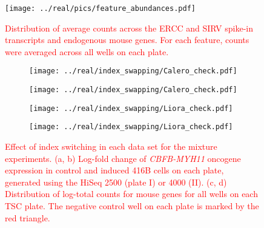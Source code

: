 \documentclass{article}
\newcommand\revised[1]{\textcolor{red}{#1}}
\begin{document}
\begin{figure}[btp]
    \begin{center}
        \texttt{[image: ../real/pics/feature\_abundances.pdf]}
    \end{center}
    \caption{\revised{Distribution of average counts across the ERCC and SIRV spike-in transcripts and endogenous mouse genes.
    For each feature, counts were averaged across all wells on each plate.}}
\end{figure}

\begin{figure}[btp]
    \begin{center}
        \begin{subfigure}{0.49\textwidth}
            \texttt{[image: ../real/index\_swapping/Calero\_check.pdf]}
            \caption{}
        \end{subfigure}
        \begin{subfigure}{0.49\textwidth}
            \texttt{[image: ../real/index\_swapping/Calero\_check.pdf]}
            \caption{}
        \end{subfigure}
        \begin{subfigure}{0.49\textwidth}
            \texttt{[image: ../real/index\_swapping/Liora\_check.pdf]}
            \caption{}
        \end{subfigure}
        \begin{subfigure}{0.49\textwidth}
            \texttt{[image: ../real/index\_swapping/Liora\_check.pdf]}
            \caption{}
        \end{subfigure}
    \end{center}
    \caption{\revised{Effect of index switching in each data set for the mixture experiments.
        (a, b) Log-fold change of \textit{CBFB-MYH11} oncogene expression in control and induced 416B cells on each plate, generated using the HiSeq 2500 (plate I) or 4000 (II).
        (c, d) Distribution of log-total counts for mouse genes for all wells on each TSC plate.
        The negative control well on each plate is marked by the red triangle.
    }}
    \label{fig:switching}
\end{figure}
\end{document}
